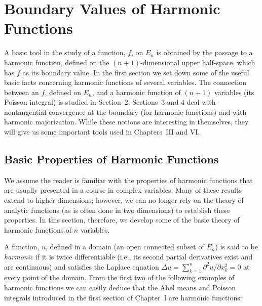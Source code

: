 \chapter{Boundary Values of Harmonic Functions}
\label{ch:harmonic}

A basic tool in the study of a function, $f$, on $E_n$ is obtained by the passage to a harmonic function, defined on the $(n+1)$-dimensional upper half-space, which has $f$ as its boundary value. In the first section we set down some of the useful basic facts concerning harmonic functions of several variables. The connection between an $f$, defined on $E_n$, and a harmonic function of $(n+1)$ variables (its Poisson integral) is studied in Section~2. Sections~3 and 4 deal with nontangential convergence at the boundary (for harmonic functions) and with harmonic majorization. While these notions are interesting in themselves, they will give us some important tools used in Chapters~III and VI.

\section{Basic Properties of Harmonic Functions}

We assume the reader is familiar with the properties of harmonic functions that are usually presented in a course in complex variables. Many of these results extend to higher dimensions; however, we can no longer rely on the theory of analytic functions (as is often done in two dimensions) to establish these properties. In this section, therefore, we develop some of the basic theory of harmonic functions of $n$ variables.

A function, $u$, defined in a domain (an open connected subset of $E_n$) is said to be \emph{harmonic} if it is twice differentiable (i.e., its second partial derivatives exist and are continuous) and satisfies the Laplace equation $\Delta u = \sum_{k=1}^{n} \partial^2 u / \partial x_k^2 = 0$ at every point of the domain. From the first two of the following examples of harmonic functions we can easily deduce that the Abel means and Poisson integrals introduced in the first section of Chapter~I are harmonic functions:

